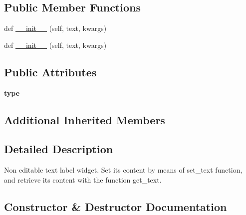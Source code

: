 \subsection*{Public Member Functions}
\begin{DoxyCompactItemize}
\item 
def \hyperlink{classremi_1_1gui_1_1Label_a277f22b421b7f59cccc7b9e6fc75de9f}{\+\_\+\+\_\+init\+\_\+\+\_\+} (self, text, kwargs)
\item 
def \hyperlink{classremi_1_1gui_1_1Label_a277f22b421b7f59cccc7b9e6fc75de9f}{\+\_\+\+\_\+init\+\_\+\+\_\+} (self, text, kwargs)
\end{DoxyCompactItemize}
\subsection*{Public Attributes}
\begin{DoxyCompactItemize}
\item 
{\bfseries type}\hypertarget{classremi_1_1gui_1_1Label_a987df9e0af9e6b87fb3e0fae6c1e6171}{}\label{classremi_1_1gui_1_1Label_a987df9e0af9e6b87fb3e0fae6c1e6171}

\end{DoxyCompactItemize}
\subsection*{Additional Inherited Members}


\subsection{Detailed Description}
\begin{DoxyVerb}Non editable text label widget. Set its content by means of set_text function, and retrieve its content with the
function get_text.
\end{DoxyVerb}
 

\subsection{Constructor \& Destructor Documentation}

